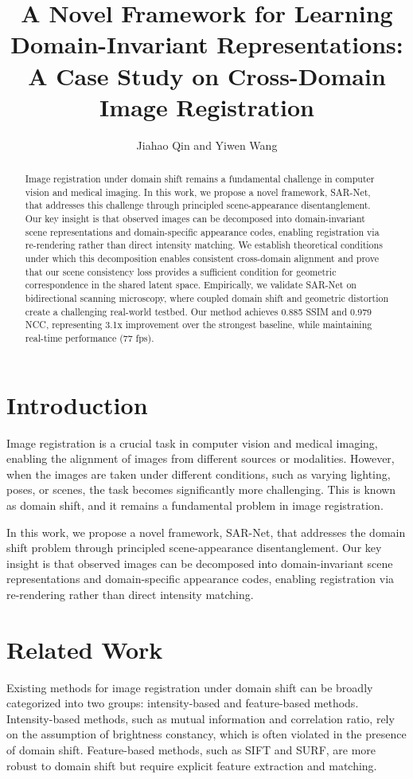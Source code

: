 \documentclass{article}
\begin{document}
\title{A Novel Framework for Learning Domain-Invariant Representations: A Case Study on Cross-Domain Image Registration}
\author{Jiahao Qin and Yiwen Wang}
\maketitle

\begin{abstract}
Image registration under domain shift remains a fundamental challenge in computer vision and medical imaging. In this work, we propose a novel framework, SAR-Net, that addresses this challenge through principled scene-appearance disentanglement. Our key insight is that observed images can be decomposed into domain-invariant scene representations and domain-specific appearance codes, enabling registration via re-rendering rather than direct intensity matching. We establish theoretical conditions under which this decomposition enables consistent cross-domain alignment and prove that our scene consistency loss provides a sufficient condition for geometric correspondence in the shared latent space. Empirically, we validate SAR-Net on bidirectional scanning microscopy, where coupled domain shift and geometric distortion create a challenging real-world testbed. Our method achieves 0.885 SSIM and 0.979 NCC, representing 3.1x improvement over the strongest baseline, while maintaining real-time performance (77 fps).
\end{abstract}

\section{Introduction}
Image registration is a crucial task in computer vision and medical imaging, enabling the alignment of images from different sources or modalities. However, when the images are taken under different conditions, such as varying lighting, poses, or scenes, the task becomes significantly more challenging. This is known as domain shift, and it remains a fundamental problem in image registration.

In this work, we propose a novel framework, SAR-Net, that addresses the domain shift problem through principled scene-appearance disentanglement. Our key insight is that observed images can be decomposed into domain-invariant scene representations and domain-specific appearance codes, enabling registration via re-rendering rather than direct intensity matching.

\section{Related Work}
Existing methods for image registration under domain shift can be broadly categorized into two groups: intensity-based and feature-based methods. Intensity-based methods, such as mutual information and correlation ratio, rely on the assumption of brightness constancy, which is often violated in the presence of domain shift. Feature-based methods, such as SIFT and SURF, are more robust to domain shift but require explicit feature extraction and matching.
\end{document}
